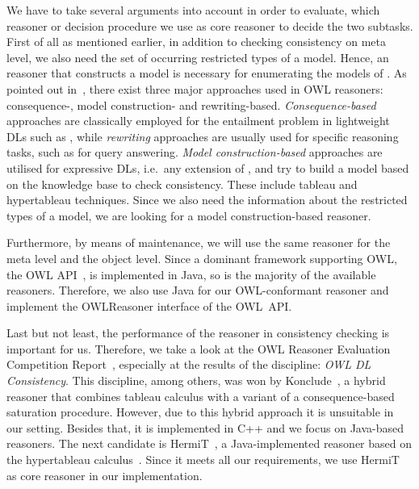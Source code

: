 We have to take several arguments into account in order to evaluate, which reasoner or decision
procedure we use as core reasoner to decide the two subtasks.
%
First of all as mentioned earlier, in addition to checking consistency on meta level, we also need
the set of occurring restricted types of a model. Hence, an reasoner that constructs a model is
necessary for enumerating the models of \Bmfb. As pointed out in~\cite{MaLHSP-ORE15}, there exist
three major approaches used in OWL reasoners: consequence-, model construction- and
rewriting-based. \emph{Consequence-based} approaches are classically employed for the entailment
problem in lightweight DLs such as \EL, while \emph{rewriting} approaches are usually used for
specific reasoning tasks, such as for query answering. \emph{Model construction-based} approaches
are utilised for expressive DLs, i.e.\ any extension of \ALC, and try to build a model based on the
knowledge base to check consistency. These include tableau and hypertableau techniques. Since we
also need the information about the restricted types of a model, we are looking for a model
construction-based reasoner.

Furthermore, by means of maintenance, we will use the same reasoner for the meta level and the
object level.
%
Since a dominant framework supporting OWL, the OWL API~\cite{HoB-SW11}, is implemented in Java, so is the
majority of the available reasoners. Therefore, we also use Java for our OWL-conformant reasoner and
implement the \textsf{OWLReasoner} interface of the OWL~API.

Last but not least, the performance of the reasoner in consistency checking is important for
us. Therefore, we take a look at the OWL Reasoner Evaluation Competition
Report~\cite{PaMGGS-SSWS15}, especially at the results of the discipline: \emph{OWL DL
  Consistency}. This discipline, among others, was won by Konclude~\cite{StLG-JWS14}, a
 hybrid reasoner that combines tableau calculus with a variant of a consequence-based
saturation procedure. However, due to this hybrid approach it is unsuitable in our
setting. Besides that, it is implemented in C++ and we focus on Java-based reasoners. The
next candidate is HermiT~\cite{GHM-JAR14}, a Java-implemented reasoner based on the hypertableau
calculus~\cite{MoSH-JAIR09}. Since it meets all our requirements, we use HermiT as core reasoner in
our implementation.



